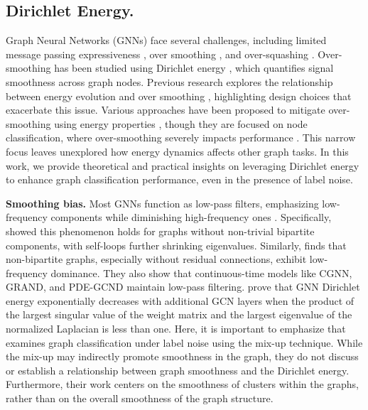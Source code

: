 \subsection{Dirichlet Energy.}
\label{sec:dir_additional_related}
Graph Neural Networks (GNNs) face several challenges, including limited message passing expressiveness \cite{WL2}, over smoothing \cite{oversmoothing2}, and over-squashing \cite{oversquashing3}. Over-smoothing has been studied using Dirichlet energy \cite{dirichlet}, which quantifies signal smoothness across graph nodes. Previous research explores the relationship between energy evolution and over smoothing \cite{noteonoversmoothing, nt2019revisiting}, highlighting design choices that exacerbate this issue. Various approaches have been proposed to mitigate over-smoothing using energy properties \cite{FAGCN, zhou2021dirichlet, EEConv}, though they are focused on node classification, where over-smoothing severely impacts performance \cite{2sides}. This narrow focus leaves unexplored how energy dynamics affects other graph tasks. In this work, we provide theoretical and practical insights on leveraging Dirichlet energy to enhance graph classification performance, even in the presence of label noise.


\textbf{Smoothing bias.} 
Most GNNs function as low-pass filters, emphasizing low-frequency components while diminishing high-frequency ones \cite{nt2019revisiting, rusch2023survey}. Specifically, \cite{nt2019revisiting} showed this phenomenon holds for graphs without non-trivial bipartite components, with self-loops further shrinking eigenvalues. Similarly, \cite{oversquashing1} finds that non-bipartite graphs, especially without residual connections, exhibit low-frequency dominance. They also show that continuous-time models like CGNN, GRAND, and PDE-GCND maintain low-pass filtering. \cite{noteonoversmoothing, oversmoothing2} prove that GNN Dirichlet energy exponentially decreases with additional GCN layers when the product of the largest singular value of the weight matrix and the largest eigenvalue of the normalized Laplacian is less than one. Here, it is important to emphasize that \cite{Kang2018RobustGL} examines graph classification under label noise using the mix-up technique. While the mix-up may indirectly promote smoothness in the graph, they do not discuss or establish a relationship between graph smoothness and the Dirichlet energy. Furthermore, their work centers on the smoothness of clusters within the graphs, rather than on the overall smoothness of the graph structure.

